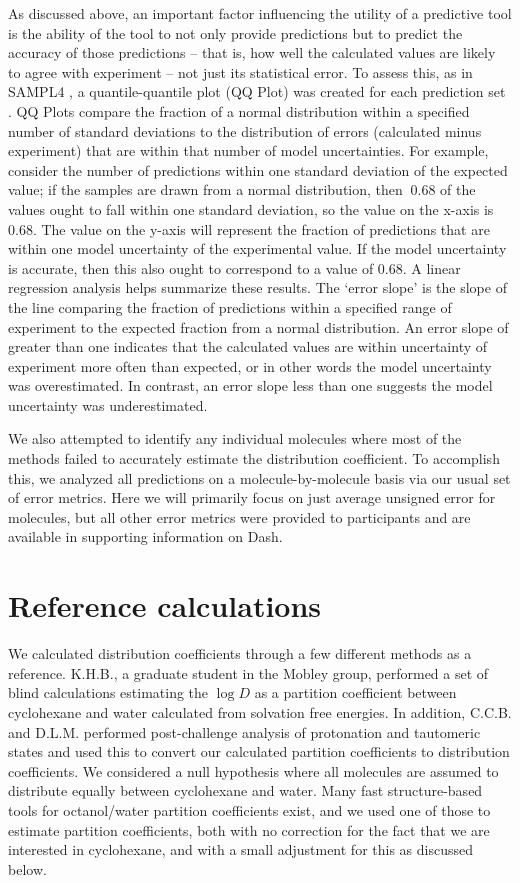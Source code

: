 As discussed above, an important factor influencing the utility of a predictive tool is the ability of the tool to not only provide predictions but to predict the accuracy of those predictions -- that is, how well the calculated values are likely to agree with experiment -- not just its statistical error.  
To assess this, as in SAMPL4  \cite{Mobley:2014gu}, a quantile-quantile plot (QQ Plot) was created for each prediction set  \cite{Wilk:1968cm}. 
QQ Plots compare the fraction of a normal distribution within a specified number of standard deviations to the distribution of errors (calculated minus experiment) that are within that number of model uncertainties.
For example, consider the number of predictions within one standard deviation of the expected value; if the samples are drawn from a normal distribution, then $~0.68$ of the values ought to fall within one standard deviation, so the value on the x-axis is $0.68$. The value on the y-axis will represent the fraction of predictions that are within one model uncertainty of the experimental value.  If the model uncertainty is accurate, then this also ought to correspond to a value of $0.68$.
A linear regression analysis helps summarize these results.
The `error slope' is the slope of the line comparing the fraction of predictions within a specified range of experiment to the expected fraction from a normal distribution.
An error slope of greater than one indicates that the calculated values are within uncertainty of experiment more often than expected, or in other words the model uncertainty was overestimated. 
In contrast, an error slope less than one suggests the model uncertainty was underestimated. 

We also attempted to identify any individual molecules where most of the methods failed to accurately estimate the distribution coefficient. 
To accomplish this, we analyzed all predictions on a molecule-by-molecule basis via our usual set of error metrics.  
Here we will primarily focus on just average unsigned error for molecules, but all other error metrics were provided to participants and are available in supporting information on Dash.

\section{Reference calculations} 
\label{methods:1}

We calculated distribution coefficients through a few different methods as a reference. 
K.H.B., a graduate student in the Mobley group, performed a set of blind calculations estimating the $\log D$ as a partition coefficient between cyclohexane and water calculated from solvation free energies.
In addition, C.C.B. and D.L.M. performed post-challenge analysis of protonation and tautomeric states and used this to convert our calculated partition coefficients to distribution coefficients.
We considered a null hypothesis where all molecules are assumed to distribute equally between cyclohexane and water.
Many fast structure-based tools for octanol/water partition coefficients exist, and we used one of those to estimate partition coefficients, both with no correction for the fact that we are interested in cyclohexane, and with a small adjustment for this as discussed below. 

